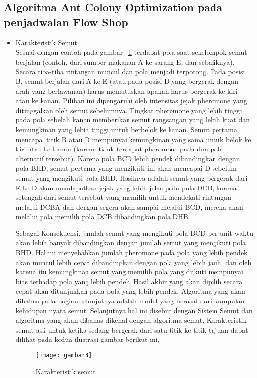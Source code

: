 \subsection{Algoritma Ant Colony Optimization pada penjadwalan Flow Shop}
\begin{itemize}
\item Karakteristik Semut \\
Sesuai dengan contoh pada gambar ~\ref{fig:karakteristiksemut1} terdapat pola saat sekelompok semut berjalan (contoh, dari sumber makanan A ke sarang E, dan sebaliknya). Secara tiba-tiba rintangan muncul dan pola menjadi terpotong. Pada posisi B, semut berjalan dari A ke E (atau pada posisi D yang bergerak dengan arah yang berlawanan) harus memutuskan apakah harus bergerak ke kiri atau ke kanan.
Pilihan ini dipengaruhi oleh intensitas jejak pheromone yang ditinggalkan oleh semut sebelumnya. Tingkat pheromone yang lebih tinggi pada pola sebelah kanan memberikan semut rangsangan yang lebih kuat dan kemungkinan yang lebih tinggi untuk berbelok ke kanan. Semut pertama mencapai titik B atau D mempunyai kemungkinan yang sama untuk belok ke kiri atau ke kanan (karena tidak terdapat pheromone pada dua pola alternatif tersebut).
Karena pola BCD lebih pendek dibandingkan dengan pola BHD, semut pertama yang mengikuti ini akan mencapai D sebelum semut yang mengikuti pola BHD. Hasilnya 
adalah semut yang bergerak dari E ke D akan mendapatkan jejak yang lebih jelas pada pola DCB, karena setengah dari semut tersebut yang memilih untuk mendekati 
rintangan melalui DCBA dan dengan segera akan sampai melalui BCD, mereka akan melalui pola memilih pola DCB dibandingkan pola DHB. 

Sebagai Konsekuensi, jumlah semut yang mengikuti pola BCD per unit waktu akan lebih banyak dibandingkan dengan jumlah semut yang mengikuti pola BHD.
Hal ini menyebabkan jumlah pheromone pada pola yang lebih pendek akan muncul lebih cepat dibandingkan dengan pola yang lebih jauh, dan oleh karena itu kemungkinan semut yang memilih pola yang diikuti mempunyai bias terhadap pola yang lebih pendek. Hasil akhir yang akan dipilih secara cepat akan ditunjukkan pada pola yang lebih pendek.	
Algoritma yang akan dibahas pada bagian selanjutnya adalah model yang berasal dari kumpulan kehidupan nyata semut. Selanjutnya hal ini disebut dengan Sistem Semut dan algoritma yang akan dibahas dikenal dengan algoritma semut. Karakteristik semut asli untuk ketika sedang bergerak dari satu titik ke titik tujuan dapat dilihat pada kedua ilustrasi gambar berikut ini.
\begin{figure}[H]
	\centering
	\texttt{[image: gambar3]}
	\caption[Contoh Karakteristik Semut] {Karakteristik semut}
	\label{fig:karakteristiksemut1}
\end{figure}


\end{itemize}
